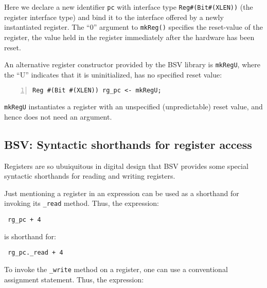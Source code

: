 Here we declare a new identifier \verb|pc| with interface type
\verb|Reg#(Bit#(XLEN))| (the register interface type) and bind it to
the interface offered by a newly instantiated register.  The ``0''
argument to \verb|mkReg()| specifies the reset-value of the register,
{\ie} the value held in the register immediately after the hardware
has been reset.

An alternative register constructor provided by the BSV library is
{\tt mkRegU}, where the ``U'' indicates that it is uninitialized,
{\ie} has no specified reset value:


{\small
\begin{Verbatim}[frame=single, numbers=left]
   Reg #(Bit #(XLEN)) rg_pc <- mkRegU;
\end{Verbatim}
}

\verb|mkRegU| instantiates a register with an unspecified
(unpredictable) reset value, and hence does not need an argument.


\subsection{BSV: Syntactic shorthands for register access}

\label{Sec_Register_syntactic_shorthands}


Registers are so ubuiquitous in digital design that BSV provides some
special syntactic shorthands for reading and writing registers.

Just mentioning a register in an expression can be used as a shorthand
for invoking its \verb|_read| method.  Thus, the expression:

\begin{tabbing}\small\tt
\hmmmm  rg\_pc + 4
\end{tabbing}

is shorthand for:

\begin{tabbing}\small\tt
\hmmmm  rg\_pc.\_read + 4
\end{tabbing}

To invoke the \verb|_write| method on a register, one can use a
conventional assignment statement.  Thus, the expression:

